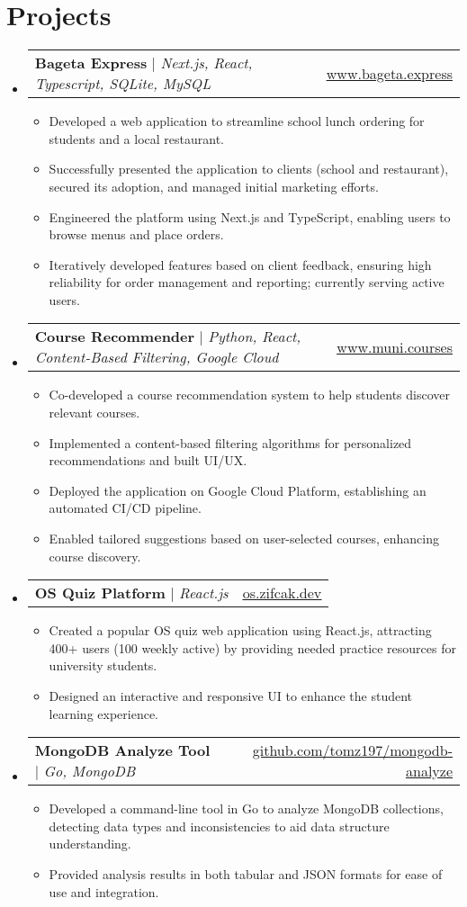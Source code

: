 \documentclass[a4paper,11pt]{article}
\makeatletter
\newcommand{\resumeItem}[1]{
  \item\small{
    {#1 \vspace{-2pt}}
  }
}
\newcommand{\resumeProjectHeadingLink}[3]{
    \item
    \begin{tabular*}{1.001\textwidth}{l@{\extracolsep{\fill}}r}
      \small#1 & \small \href{#2}{\underline{#3}}\\
    \end{tabular*}\vspace{-7pt}
}
\newcommand{\resumeSubHeadingListStart}{\begin{itemize}[leftmargin=0.0in, label={}]}
\newcommand{\resumeSubHeadingListEnd}{\end{itemize}}
\newcommand{\resumeItemListStart}{\begin{itemize}}
\newcommand{\resumeItemListEnd}{\end{itemize}\vspace{-5pt}}
\makeatother
\begin{document}
\section{Projects}
    \vspace{-5pt}
    \resumeSubHeadingListStart
      \resumeProjectHeadingLink
          {\textbf{Bageta Express} $|$ \emph{Next.js, React, Typescript, SQLite, MySQL}}{https://bageta.express}{www.bageta.express}
          \resumeItemListStart
            \resumeItem{Developed a web application to streamline school lunch ordering for students and a local restaurant.}
            \resumeItem{Successfully presented the application to clients (school and restaurant), secured its adoption, and managed initial marketing efforts.}
            \resumeItem{Engineered the platform using Next.js and TypeScript, enabling users to browse menus and place orders.}
            \resumeItem{Iteratively developed features based on client feedback, ensuring high reliability for order management and reporting; currently serving active users.}
          \resumeItemListEnd
          \vspace{-13pt}
      \resumeProjectHeadingLink
          {\textbf{Course Recommender} $|$ \emph{Python, React, Content-Based Filtering, Google Cloud}}{https://muni.courses}{www.muni.courses}
          \resumeItemListStart
            \resumeItem{Co-developed a course recommendation system to help students discover relevant courses.}
            \resumeItem{Implemented a content-based filtering algorithms for personalized recommendations and built UI/UX.}
            \resumeItem{Deployed the application on Google Cloud Platform, establishing an automated CI/CD pipeline.}
            \resumeItem{Enabled tailored suggestions based on user-selected courses, enhancing course discovery.}
          \resumeItemListEnd 
          \vspace{-13pt}
      \resumeProjectHeadingLink
          {\textbf{OS Quiz Platform} $|$ \emph{React.js}}{https://os.zifcak.dev}{os.zifcak.dev}
          \resumeItemListStart
            \resumeItem{Created a popular OS quiz web application using React.js, attracting 400+ users (100 weekly active) by providing needed practice resources for university students.}
            \resumeItem{Designed an interactive and responsive UI to enhance the student learning experience.}
          \resumeItemListEnd
          \vspace{-13pt}
      \resumeProjectHeadingLink
          {\textbf{MongoDB Analyze Tool} $|$ \emph{Go, MongoDB}}{https://github.com/tomz197/mongodb-analyze}{github.com/tomz197/mongodb-analyze}
          \resumeItemListStart
            \resumeItem{Developed a command-line tool in Go to analyze MongoDB collections, detecting data types and inconsistencies to aid data structure understanding.}
            \resumeItem{Provided analysis results in both tabular and JSON formats for ease of use and integration.}
          \resumeItemListEnd 
    \resumeSubHeadingListEnd
\vspace{-15pt}
\end{document}
